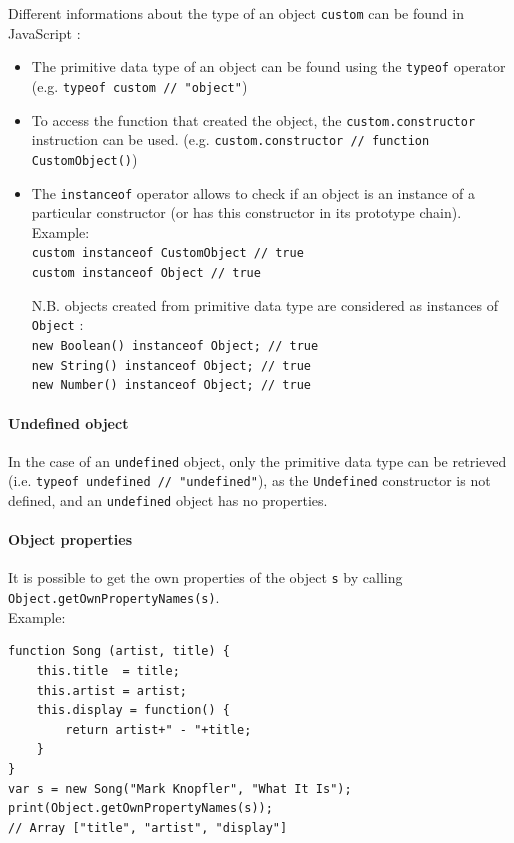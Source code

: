 \documentclass[a4paper,10pt]{article}
\begin{document}
Different informations about the type of an object \lstinline|custom| can be found in JavaScript :
\begin{itemize}
\item The primitive data type of an object can be found using the \lstinline|typeof| operator (e.g. \lstinline|typeof custom // "object"|)

\item To access the function that created the object, the \lstinline|custom.constructor| instruction can be used. (e.g. \lstinline|custom.constructor // function CustomObject()|)

\item The \lstinline|instanceof| operator allows to check if an object is an instance of a particular constructor (or has this constructor in its prototype chain). \\
		Example: \\
		\lstinline|custom instanceof CustomObject // true| \\
		\lstinline|custom instanceof Object // true|

		\smallskip
		N.B. objects created from primitive data type are considered as instances of \lstinline|Object| : \\
		\lstinline|new Boolean() instanceof Object; // true| \\
		\lstinline|new String() instanceof Object; // true| \\
		\lstinline|new Number() instanceof Object; // true| \\
\end{itemize}


\paragraph{Undefined object}{
In the case of an \lstinline|undefined| object, only the primitive data type can be retrieved (i.e. \lstinline|typeof undefined // "undefined"|), as the \lstinline|Undefined| constructor is not defined, and an \lstinline|undefined| object has no properties.
}


\paragraph{Object properties}{
It is possible to get the own properties of the object \lstinline|s| by calling \lstinline|Object.getOwnPropertyNames(s)|. \\
Example:
\begin{lstlisting}
function Song (artist, title) {
    this.title  = title;
    this.artist = artist;
    this.display = function() {
        return artist+" - "+title;
    }
}
var s = new Song("Mark Knopfler", "What It Is");
print(Object.getOwnPropertyNames(s));
// Array ["title", "artist", "display"]
\end{lstlisting}
}
\end{document}
